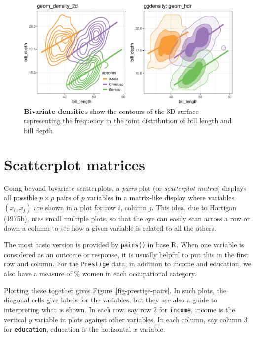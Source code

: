 \documentclass[
  letterpaper,
  10pt,
  krantz2]{krantz}
\begin{document}
\begin{figure}[H]

{\centering \includegraphics[width=1.2\textwidth,height=\textheight]{figs/ch03/fig-peng-ggdensity-1.pdf}

}

\caption{\label{fig-peng-ggdensity}\textbf{Bivariate densities} show the
contours of the 3D surface representing the frequency in the joint
distribution of bill length and bill depth.}

\end{figure}

\hypertarget{sec-scatmat}{%
\section{Scatterplot matrices}\label{sec-scatmat}}

Going beyond bivariate scatterplots, a \emph{pairs} plot (or
\emph{scatterplot matrix}) displays all possible \(p \times p\) pairs of
\(p\) variables in a matrix-like display where variables \((x_i, x_j)\)
are shown in a plot for row \(i\), column \(j\). This idea, due to
Hartigan (\protect\hyperlink{ref-Hartigan:75b}{1975b}), uses small
multiple plots, so that the eye can easily scan across a row or down a
column to see how a given variable is related to all the others.

The most basic version is provided by \texttt{pairs()} in base R. When
one variable is considered as an outcome or response, it is usually
helpful to put this in the first row and column. For the
\texttt{Prestige} data, in addition to income and education, we also
have a measure of \% women in each occupational category.

Plotting these together gives Figure~\ref{fig-prestige-pairs}. In such
plots, the diagonal cells give labels for the variables, but they are
also a guide to interpreting what is shown. In each row, say row 2 for
\texttt{income}, income is the vertical \(y\) variable in plots against
other variables. In each column, say column 3 for \texttt{education},
education is the horizontal \(x\) variable.
\end{document}
